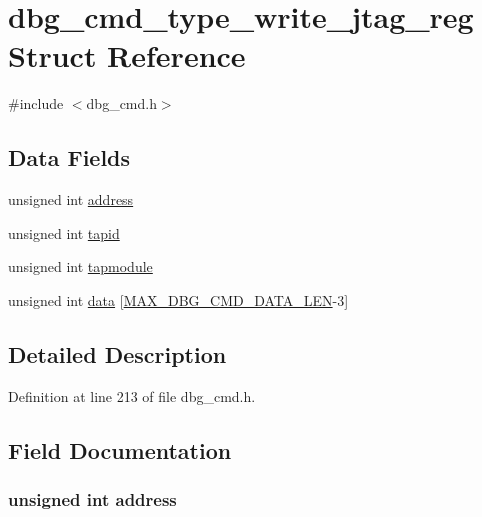 \hypertarget{structdbg__cmd__type__write__jtag__reg}{\section{dbg\-\_\-cmd\-\_\-type\-\_\-write\-\_\-jtag\-\_\-reg Struct Reference}
\label{structdbg__cmd__type__write__jtag__reg}
}


{\ttfamily \#include $<$dbg\-\_\-cmd.\-h$>$}

\subsection*{Data Fields}
\begin{DoxyCompactItemize}
\item 
unsigned int \hyperlink{structdbg__cmd__type__write__jtag__reg_a2f55ff1f6cd45ca1b6431493ab5614eb}{address}
\item 
unsigned int \hyperlink{structdbg__cmd__type__write__jtag__reg_ab45a32c579f91cd302a98e9f3000e245}{tapid}
\item 
unsigned int \hyperlink{structdbg__cmd__type__write__jtag__reg_a81cc17fe846b9d6fa02f6ebccb89a542}{tapmodule}
\item 
unsigned int \hyperlink{structdbg__cmd__type__write__jtag__reg_a728dc245dc576de10147524d6a701ef3}{data} \mbox{[}\hyperlink{dbg__cmd_8h_a4552ec15033c8a68870cdf80eda5470c}{M\-A\-X\-\_\-\-D\-B\-G\-\_\-\-C\-M\-D\-\_\-\-D\-A\-T\-A\-\_\-\-L\-E\-N}-\/3\mbox{]}
\end{DoxyCompactItemize}


\subsection{Detailed Description}


Definition at line 213 of file dbg\-\_\-cmd.\-h.



\subsection{Field Documentation}
\hypertarget{structdbg__cmd__type__write__jtag__reg_a2f55ff1f6cd45ca1b6431493ab5614eb}{
\subsubsection[{address}]{\setlength{\rightskip}{0pt plus 5cm}unsigned int address}}\label{structdbg__cmd__type__write__jtag__reg_a2f55ff1f6cd45ca1b6431493ab5614eb}


